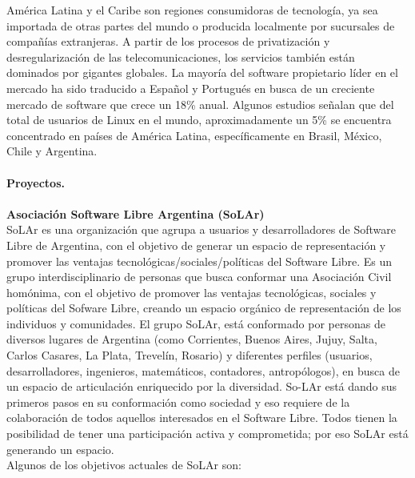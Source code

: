 \documentclass{book}
\begin{document}
América Latina y el Caribe son regiones consumidoras de tecnología, ya sea importada de otras partes del mundo o producida localmente por sucursales de compañías extranjeras. A partir de los procesos de privatización y desregularización de las telecomunicaciones, los servicios también están dominados por gigantes globales. La mayoría del software propietario líder en el mercado ha sido traducido a Español y Portugués en busca de un creciente mercado de software que crece un 18\% anual.
Algunos estudios señalan que del total de usuarios de Linux en el mundo, aproximadamente un 5\% se encuentra concentrado en países de América Latina, específicamente en Brasil, México, Chile y Argentina.
\\
\\
{\bf Proyectos.}
\\
\\
{\bf Asociación Software Libre Argentina (SoLAr)}
\\
SoLAr es una organización que agrupa a usuarios y desarrolladores de Software Libre de Argentina, con el objetivo de generar un espacio de representación y promover las ventajas tecnológicas/sociales/políticas del Software Libre.
Es un grupo interdisciplinario de personas que busca conformar una Asociación Civil homónima, con el objetivo de promover las ventajas tecnológicas, sociales y políticas del Sofware Libre, creando un espacio orgánico de representación de los individuos y comunidades. El grupo SoLAr, está conformado por personas de diversos lugares de Argentina (como Corrientes, Buenos Aires, Jujuy, Salta, Carlos Casares, La Plata, Trevelín, Rosario) y diferentes perfiles (usuarios, desarrolladores, ingenieros, matemáticos,
contadores, antropólogos), en busca de un espacio de articulación enriquecido por la diversidad. So-LAr está dando sus primeros pasos en su conformación como sociedad y eso requiere de la colaboración de todos aquellos interesados en el Software Libre. Todos tienen la posibilidad de tener una participación activa y comprometida; por eso SoLAr está generando un espacio.
\\
Algunos de los objetivos actuales de SoLAr son:
\end{document}
